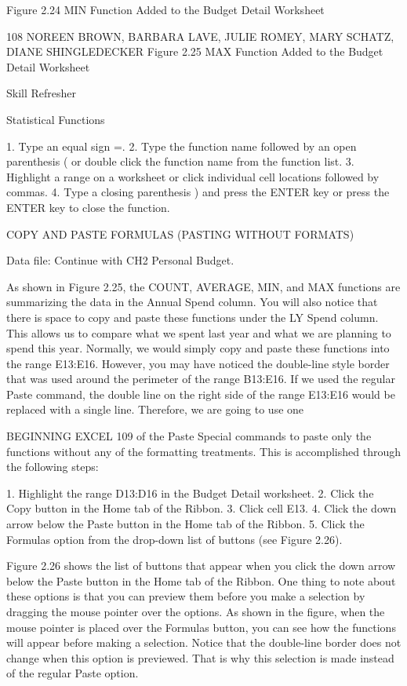 Figure 2.24 MIN Function Added to the Budget Detail Worksheet




108 NOREEN BROWN, BARBARA LAVE, JULIE ROMEY, MARY SCHATZ, DIANE SHINGLEDECKER
Figure 2.25 MAX Function Added to the Budget Detail Worksheet




Skill Refresher


Statistical Functions

1. Type an equal sign =.
2. Type the function name followed by an open parenthesis ( or double click the function name from the
function list.
3. Highlight a range on a worksheet or click individual cell locations followed by commas.
4. Type a closing parenthesis ) and press the ENTER key or press the ENTER key to close the function.



COPY AND PASTE FORMULAS (PASTING WITHOUT FORMATS)

Data file: Continue with CH2 Personal Budget.

As shown in Figure 2.25, the COUNT, AVERAGE, MIN, and MAX functions are summarizing the
data in the Annual Spend column. You will also notice that there is space to copy and paste these
functions under the LY Spend column. This allows us to compare what we spent last year and what we
are planning to spend this year. Normally, we would simply copy and paste these functions into the
range E13:E16. However, you may have noticed the double-line style border that was used around the
perimeter of the range B13:E16. If we used the regular Paste command, the double line on the right
side of the range E13:E16 would be replaced with a single line. Therefore, we are going to use one

BEGINNING EXCEL 109
of the Paste Special commands to paste only the functions without any of the formatting treatments.
This is accomplished through the following steps:

1.    Highlight the range D13:D16 in the Budget Detail worksheet.
2.    Click the Copy button in the Home tab of the Ribbon.
3.    Click cell E13.
4.    Click the down arrow below the Paste button in the Home tab of the Ribbon.
5.    Click the Formulas option from the drop-down list of buttons (see Figure 2.26).

Figure 2.26 shows the list of buttons that appear when you click the down arrow below the Paste
button in the Home tab of the Ribbon. One thing to note about these options is that you can preview
them before you make a selection by dragging the mouse pointer over the options. As shown in the
figure, when the mouse pointer is placed over the Formulas button, you can see how the functions
will appear before making a selection. Notice that the double-line border does not change when this
option is previewed. That is why this selection is made instead of the regular Paste option.




